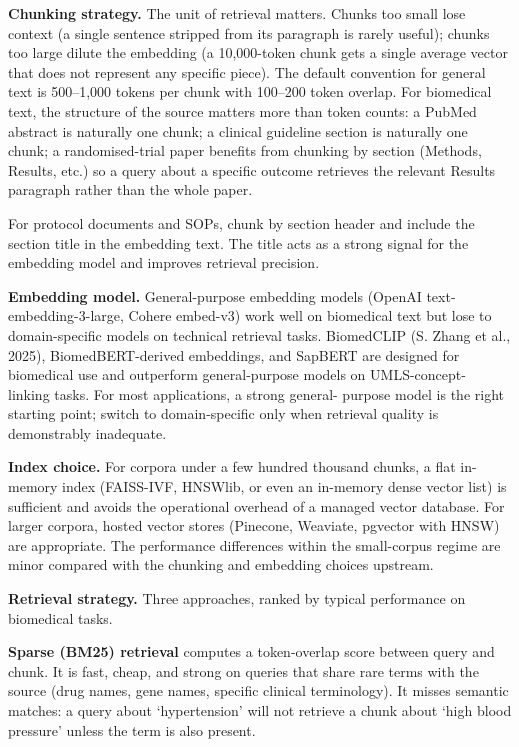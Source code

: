 \documentclass[
  letterpaper,
  11pt]{scrbook}
\begin{document}
\textbf{Chunking strategy.} The unit of retrieval matters. Chunks too
small lose context (a single sentence stripped from its paragraph is
rarely useful); chunks too large dilute the embedding (a 10,000-token
chunk gets a single average vector that does not represent any specific
piece). The default convention for general text is 500--1,000 tokens per
chunk with 100--200 token overlap. For biomedical text, the structure of
the source matters more than token counts: a PubMed abstract is
naturally one chunk; a clinical guideline section is naturally one
chunk; a randomised-trial paper benefits from chunking by section
(Methods, Results, etc.) so a query about a specific outcome retrieves
the relevant Results paragraph rather than the whole paper.

For protocol documents and SOPs, chunk by section header and include the
section title in the embedding text. The title acts as a strong signal
for the embedding model and improves retrieval precision.

\textbf{Embedding model.} General-purpose embedding models (OpenAI
text-embedding-3-large, Cohere embed-v3) work well on biomedical text
but lose to domain-specific models on technical retrieval tasks.
BiomedCLIP (S. Zhang et al., 2025), BiomedBERT-derived embeddings, and
SapBERT are designed for biomedical use and outperform general-purpose
models on UMLS-concept- linking tasks. For most applications, a strong
general- purpose model is the right starting point; switch to
domain-specific only when retrieval quality is demonstrably inadequate.

\textbf{Index choice.} For corpora under a few hundred thousand chunks,
a flat in-memory index (FAISS-IVF, HNSWlib, or even an in-memory dense
vector list) is sufficient and avoids the operational overhead of a
managed vector database. For larger corpora, hosted vector stores
(Pinecone, Weaviate, pgvector with HNSW) are appropriate. The
performance differences within the small-corpus regime are minor
compared with the chunking and embedding choices upstream.

\textbf{Retrieval strategy.} Three approaches, ranked by typical
performance on biomedical tasks.

\textbf{Sparse (BM25) retrieval} computes a token-overlap score between
query and chunk. It is fast, cheap, and strong on queries that share
rare terms with the source (drug names, gene names, specific clinical
terminology). It misses semantic matches: a query about `hypertension'
will not retrieve a chunk about `high blood pressure' unless the term is
also present.
\end{document}
